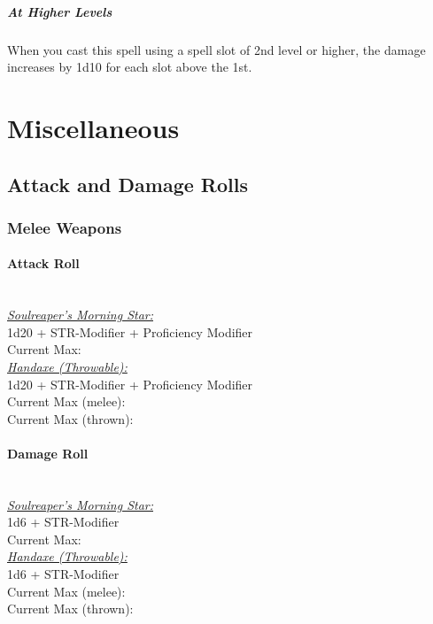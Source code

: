 \documentclass[letterpaper,openany,oneside,twocolumn]{book}
\begin{document}
\subparagraph*{At Higher Levels} When you cast this spell using a spell slot of 2nd level or higher, the damage increases by 1d10 for each slot above the 1st.

\section*{Miscellaneous}
\subsection*{Attack and Damage Rolls}
\subsubsection*{Melee Weapons}
\paragraph*{Attack Roll}\hfill\\
\underline{\textit{Soulreaper's Morning Star:}}\\
1d20 + STR-Modifier + Proficiency Modifier\\
\indent Current Max: 
\\
\underline{\textit{Handaxe (Throwable):}}\\
1d20 + STR-Modifier + Proficiency Modifier\\
\indent Current Max (melee): \\
\indent Current Max (thrown): 
\paragraph*{Damage Roll}\hfill\\
\underline{\textit{Soulreaper's Morning Star:}}\\
1d6 + STR-Modifier\\
\indent Current Max: 
\\
\underline{\textit{Handaxe (Throwable):}}\\
1d6 + STR-Modifier\\
\indent Current Max (melee): \\
\indent Current Max (thrown): 
\end{document}
